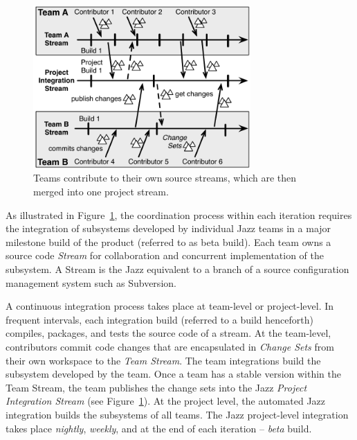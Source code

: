 \documentclass[12pt,oneside]{book}
\newcommand{\et}[1]{\emph{#1}}
\begin{document}
\begin{figure}[t]
\begin{center}
\includegraphics[width=8.3cm]{figures/BuildResult}
\caption{Teams contribute to their own source streams, which are then merged into one project stream.}
\label{fig:BuildResult}
\end{center}
\end{figure}


As illustrated in Figure~\ref{fig:BuildResult}, the coordination process within
each iteration requires the integration of subsystems developed by individual
Jazz teams in a major milestone build of the product (referred to as beta build).
Each team owns a source code \et{Stream} for collaboration and concurrent
implementation of the subsystem. A Stream is the Jazz equivalent to a branch of a
source configuration management system such as Subversion.

A continuous integration process takes place at team-level or project-level. In
frequent intervals, each integration build (referred to a build henceforth)
compiles, packages, and tests the source code of a stream. At the team-level,
contributors commit code changes that are encapsulated in \et{Change Sets} from
their own workspace to the \et{Team Stream}. The team integrations build the
subsystem developed by the team. Once a team has a stable version within the Team
Stream, the team publishes the change sets into the Jazz \et{Project Integration
Stream} (see Figure~\ref{fig:BuildResult}). At the project level, the automated
Jazz integration builds the subsystems of all teams. The Jazz project-level
integration takes place \et{nightly}, \et{weekly}, and at the end of each
iteration -- \et{beta} build.
\end{document}

